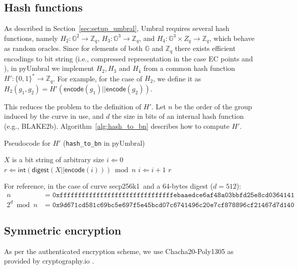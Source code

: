 \documentclass{amsart}
\newcommand{\pyumbral}{\textsf{pyUmbral}}
\newcommand{\secp}{\textsf{secp256k1}}
\begin{document}
\subsection{Hash functions}
As described in Section~\ref{sec:setup_umbral}, Umbral requires several hash functions, namely $H_2: \mathbb G^2 \to \mathbb Z_q$, $H_3: \mathbb G^3 \to \mathbb Z_q$, and $H_4: \mathbb G^3 \times Z_q \to \mathbb Z_q$, which behave as random oracles. Since for elements of both $\mathbb G$ and $\mathbb Z_q$ there exists efficient encodings to bit string (i.e., compressed representation in the case EC points and ), in \textsf{pyUmbral} we implement $H_2, H_3$ and $H_4$ from a common hash function $H': \{0,1\}^* \to \mathbb Z_q$. For example, for the case of $H_2$, we define it as $H_2(g_1, g_2) = H'(\mathsf{encode}(g_1)||\mathsf{encode}(g_2))$.

This reduces the problem to the definition of $H'$. Let $n$ be the order of the group induced by the curve in use, and $d$ the size in bits of an internal hash function (e.g., \textsf{BLAKE2b}). Algorithm~\ref{alg:hash_to_bn} describes how to compute $H'$. 


\begin{algorithm} %
\caption{Pseudocode for $H'$ (\texttt{hash\_to\_bn} in \pyumbral)} %
\label{alg:hash_to_bn} %
\begin{algorithmic} %
	\REQUIRE $X$ is a bit string of arbitrary size
    \STATE $i \Leftarrow 0$
	\REPEAT
		\STATE $r \Leftarrow \mathsf{int}(\mathsf{digest}(X||\mathsf{encode}(i))) \bmod n$
		\STATE $i \Leftarrow i + 1$
	\RETURN $r$
\end{algorithmic}
\end{algorithm}

For reference, in the case of curve \secp~and a 64-bytes digest ($d=512$):
\begin{align*} 
n &= \mathtt{0xfffffffffffffffffffffffffffffffebaaedce6af48a03bbfd25e8cd0364141} \\ 
2^d \bmod n &= \mathtt{0x9d671cd581c69bc5e697f5e45bcd07c6741496c20e7cf878896cf21467d7d140}
\end{align*}

\subsection{Symmetric encryption}
As per the authenticated encryption scheme, we use Chacha20-Poly1305 as provided by cryptography.io \cite{chacha20-pyca}.
\end{document}
